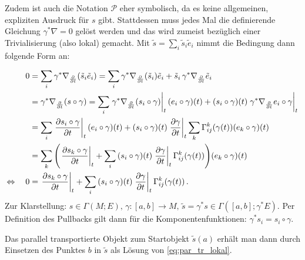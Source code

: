 \documentclass[../H_Analysis_main.tex]{subfiles}
\begin{document}
Zudem ist auch die Notation $\mathcal{P}$ eher symbolisch, da es keine allgemeinen, expliziten Ausdruck für $s$ gibt. Stattdessen muss jedes Mal die definierende Gleichung $\gamma^* \nabla = 0$ gelöst werden und das wird zumeist bezüglich einer Trivialisierung (also lokal) gemacht. Mit $\tilde{s} = \sum_i \tilde{s}_i \tilde{e}_i$ nimmt die Bedingung dann folgende Form an:
\iffalse
Für $\tilde{s} = \sum_i \tilde{s}_i \tilde{e}_i$ ergibt sich folgende lokale Darstellung der Parallelitätsbedingung:
\begin{align*}
0 &= \gamma^* \nabla \tilde{s} = \sum_i \gamma^* \nabla \qty(\tilde{s}_i \tilde{e}_i) = \sum_i \gamma^* \nabla \qty(\tilde{s}_i) \tilde{e}_i + \tilde{s}_i \gamma^* \nabla \tilde{e}_i \, .
\end{align*}
Wird nun speziell in Richtung $\pdv{t}$ abgeleitet, so ergibt sich für $\tilde{s} = \gamma^* s$:
\fi
\begin{align}
0 &= \sum_i \gamma^* \nabla_{\pdv{t}} \qty(\tilde{s}_i \tilde{e}_i) = \sum_i \gamma^* \nabla_{\pdv{t}} \qty(\tilde{s}_i) \tilde{e}_i + \tilde{s}_i \, \gamma^* \nabla_{\pdv{t}} \tilde{e}_i
\notag\\
&= \gamma^* \nabla_{\pdv{t}} \qty(s \circ \gamma) = \sum_i \eval{\gamma^* \nabla_{\pdv{t}} \qty(s_i \circ \gamma)}_t \qty(e_i \circ \gamma)(t) + \qty(s_i \circ \gamma)(t) \eval{\gamma^* \nabla_{\pdv{t}} e_i \circ \gamma}_t
\notag\\
&= \sum_i \eval{\pdv{s_i \circ \gamma}{t}}_t \qty(e_i \circ \gamma)(t) + \qty(s_i \circ \gamma)(t) \eval{\pdv{\gamma}{t}}_t \sum_k \Gamma_{ij}^k(\gamma(t)) \qty(e_k \circ \gamma)(t)
\notag\\
&= \sum_k \qty(\eval{\pdv{s_k \circ \gamma}{t}}_t + \sum_i \qty(s_i \circ \gamma)(t) \eval{\pdv{\gamma}{t}}_t \Gamma_{ij}^k(\gamma(t))) \qty(e_k \circ \gamma)(t)
\notag\\
\Leftrightarrow \quad 0 &= \eval{\pdv{s_k \circ \gamma}{t}}_t + \sum_i \qty(s_i \circ \gamma)(t) \eval{\pdv{\gamma}{t}}_t \Gamma_{ij}^k(\gamma(t)) \, .
\label{eq:par_tr_lokal}
\end{align}
Zur Klarstellung: $s \in \Gamma(M; E), \, \gamma: [a, b] \rightarrow M, \, \tilde{s} = \gamma^* s \in \Gamma([a, b]; \gamma^* E)$. Per Definition des Pullbacks gilt dann für die Komponentenfunktionen: $\gamma^* s_i = s_i \circ \gamma$.


Das parallel transportierte Objekt zum Startobjekt $\tilde{s}(a)$ erhält man dann durch Einsetzen des Punktes $b$ in $\tilde{s}$ als Lösung von \eqref{eq:par_tr_lokal}.
\end{document}
